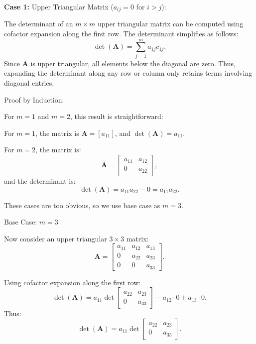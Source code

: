 \documentclass[12pt]{article}
\begin{document}
 \textbf{Case 1:} Upper Triangular Matrix (\( a_{ij} = 0 \) for \( i > j \)):

    The determinant of an \( m \times m \) upper triangular matrix can be computed using cofactor expansion along the first row. The determinant simplifies as follows:
    \[
    \det(\mathbf{A}) = \sum_{j=1}^m a_{1j} c_{1j}.
    \]
    Since \( \mathbf{A} \) is upper triangular, all elements below the diagonal are zero. Thus, expanding the determinant along any row or column only retains terms involving diagonal entries.
    \vspace{\baselineskip}

    Proof by Induction:
    
    For \( m = 1 \) and \( m = 2 \), this result is straightforward:
    
    For \( m = 1 \), the matrix is \( \mathbf{A} = [a_{11}] \), and \( \det(\mathbf{A}) = a_{11} \).
    
    For \( m = 2 \), the matrix is:
    \[
    \mathbf{A} = 
    \begin{bmatrix}
    a_{11} & a_{12} \\
    0 & a_{22}
    \end{bmatrix},
    \]
    and the determinant is:
    \[
    \det(\mathbf{A}) = a_{11} a_{22} - 0 = a_{11} a_{22}.
    \]
    
    These cases are too obvious, so we use base case as $m=3$.
    \vspace{\baselineskip}

    Base Case: \( m = 3 \)
    
    Now consider an upper triangular \( 3 \times 3 \) matrix:
    \[
    \mathbf{A} = 
    \begin{bmatrix}
    a_{11} & a_{12} & a_{13} \\
    0 & a_{22} & a_{23} \\
    0 & 0 & a_{33}
    \end{bmatrix}.
    \]
    
    Using cofactor expansion along the first row:
    \[
    \det(\mathbf{A}) = a_{11} \det
    \begin{bmatrix}
    a_{22} & a_{23} \\
    0 & a_{33}
    \end{bmatrix}
    - a_{12} \cdot 0 + a_{13} \cdot 0.
    \]
    Thus:
    \[
    \det(\mathbf{A}) = a_{11} \det
    \begin{bmatrix}
    a_{22} & a_{23} \\
    0 & a_{33}
    \end{bmatrix}.
    \]
        
\end{document}
